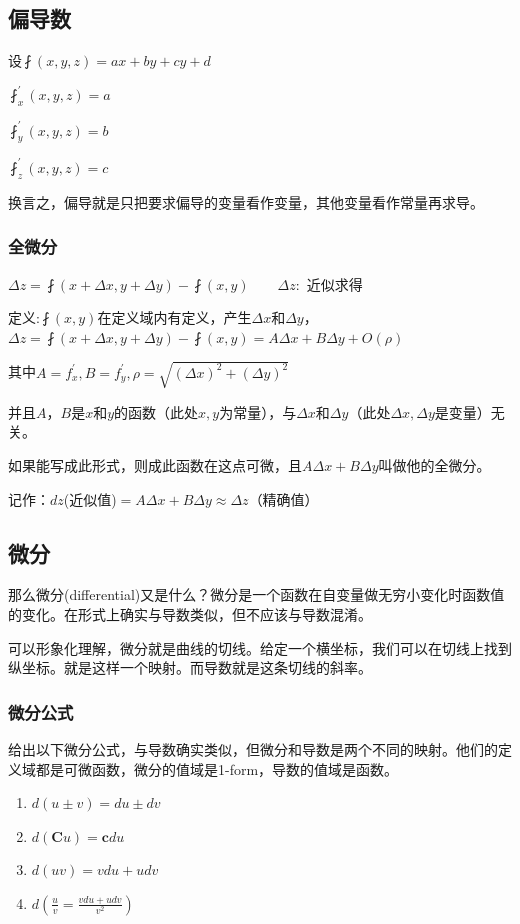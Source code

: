 \documentclass[UTF8]{ctexbook}
\newcommand{\partialDerivative}[1]{^\prime_{#1}}
\newcommand{\defFunction}[1]{\fint(#1)}
\begin{document}
{{{}%

\subsection{偏导数}{

  设$\defFunction{x,y,z} = ax + by + cy + d$

  $\fint\partialDerivative{x}(x,y,z) = a$

  $\fint\partialDerivative{y}(x,y,z) = b$

  $\fint\partialDerivative{z}(x,y,z) = c$

  换言之，偏导就是只把要求偏导的变量看作变量，其他变量看作常量再求导。

  \subsubsection{全微分}{

    $\Delta z = \defFunction{x + \Delta x,y + \Delta y} - \defFunction{x,y}\qquad\Delta z : $ 近似求得

    定义:$\defFunction{x,y}$在定义域内有定义，产生$\Delta x$和$\Delta y$，$\Delta z = \defFunction{x + \Delta x,y + \Delta y} - \defFunction{x,y} = A\Delta x + B\Delta y + O(\rho)$

    其中$A = f\partialDerivative{x}, B = f\partialDerivative{y}, \rho = \sqrt{(\Delta x)^2 + (\Delta y)^2}$

    并且$A，B$是$x$和$y$的函数（此处$x,y$为常量），与$\Delta x$和$\Delta y$（此处$\Delta x, \Delta y$是变量）无关。

    如果能写成此形式，则成此函数在这点可微，且$A\Delta x + B\Delta y$叫做他的全微分。

    记作：$dz$(近似值)$= A\Delta x + B\Delta y \approx \Delta z$（精确值）

  }

}%

\subsection{微分}{
那么微分(differential)又是什么？微分是一个函数在自变量做无穷小变化时函数值的变化。在形式上确实与导数类似，但不应该与导数混淆。

可以形象化理解，微分就是曲线的切线。给定一个横坐标，我们可以在切线上找到纵坐标。就是这样一个映射。而导数就是这条切线的斜率。

\subsubsection{微分公式}{
  给出以下微分公式，与导数确实类似，但微分和导数是两个不同的映射。他们的定义域都是可微函数，微分的值域是1-form，导数的值域是函数。
  \begin{enumerate}
    \item $d(u \pm v) = du \pm dv$
    \item $d(\mathbf{C}u) = \mathbf{c}du$
    \item $d(uv) = vdu + udv$
    \item $d(\frac{u}{v} = \frac{vdu + udv}{v^2})$
  \end{enumerate}
}%

}}}
\end{document}
